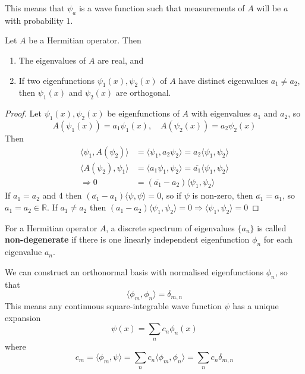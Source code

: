 \begin{remark}
	This means that $\psi_a$ is a wave function such that measurements of $A$ will be $a$ with probability $1$.
\end{remark}

\begin{theorem}
	Let $A$ be a Hermitian operator. Then
	\begin{enumerate}
		\item The eigenvalues of $A$ are real, and
		\item If two eigenfunctions $\psi_1(x), \psi_2(x)$ of $A$ have distinct eigenvalues $a_1 \ne a_2$, then $\psi_1(x)$ and $\psi_2(x)$ are orthogonal.
	\end{enumerate}
\end{theorem}

\begin{proof}
	Let $\psi_1(x), \psi_2(x)$ be eigenfunctions of $A$ with eigenvalues $a_1$ and $a_2$, so
	\[
		A(\psi_1(x)) = a_1 \psi_1(x), \quad A(\psi_2(x)) = a_2 \psi_2(x)
	\]
	Then
	\[
		\begin{aligned}
			\langle \psi_1, A(\psi_2) \rangle & = \langle \psi_1, a_2 \psi_2 \rangle = a_2 \langle \psi_1, \psi_2 \rangle \\
			\langle A(\psi_2), \psi_1 \rangle & = \langle a_1 \psi_1, \psi_2 \rangle = \overline{a_1} \langle \psi_1, \psi_2 \rangle \\
			\Longrightarrow 0 & = (\overline{a_1} - a_2) \langle \psi_1, \psi_2 \rangle
		\end{aligned}
	\]
	If $a_1 = a_2$ and 4 then $(\overline{a_1} - a_1) \langle \psi, \psi \rangle = 0$, so if $\psi$ is non-zero, then $\overline{a_1} = a_1$, so $a_1 = a_2 \in \mathbb{R}$. If $a_1 \ne a_2$ then $(a_1 - a_2) \langle \psi_1, \psi_2 \rangle = 0 \Longrightarrow \langle \psi_1, \psi_2 \rangle = 0$
\end{proof}

\begin{definition}
	For a Hermitian operator $A$, a discrete spectrum of eigenvalues $\{ a_n \}$ is called \textbf{non-degenerate} if there is one linearly independent eigenfunction $\phi_n$ for each eigenvalue $a_n$.
\end{definition}

\begin{corollary}
	We can construct an orthonormal basis with normalised eigenfunctions $\phi_n$, so that
	\[
		\langle \phi_m, \phi_n \rangle = \delta_{m, n}
	\]
	This means any continuous square-integrable wave function $\psi$ has a unique expansion
	\[
		\psi(x) = \sum_n c_n \phi_n(x)
	\]
	where
	\[
		c_m = \langle \phi_m, \psi \rangle = \sum_n c_n \langle \phi_m, \phi_n \rangle = \sum_n c_n \delta_{m, n}
	\]
\end{corollary}

